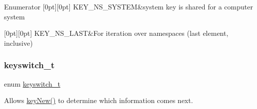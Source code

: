 \begin{DoxyEnumFields}{Enumerator}
[0pt][0pt]{}\mbox{\label{group__key_ggaec3b8d6f430ae49b91bafe8a86310a68a61adca2f9dff47e65dfcdb492ffa7a20}} 
K\+E\+Y\+\_\+\+N\+S\+\_\+\+S\+Y\+S\+T\+EM&system key is shared for a computer system \\
\hline

[0pt][0pt]{}\mbox{\label{group__key_ggaec3b8d6f430ae49b91bafe8a86310a68ad4d0f219a657517ddd50cd06c8190310}} 
K\+E\+Y\+\_\+\+N\+S\+\_\+\+L\+A\+ST&For iteration over namespaces (last element, inclusive) \\
\hline

\end{DoxyEnumFields}
\mbox{\label{group__key_ga91fb3178848bd682000958089abbaf40}} 
\subsubsection{\texorpdfstring{keyswitch\+\_\+t}{keyswitch\_t}}
{\footnotesize\ttfamily enum \hyperlink{group__key_ga91fb3178848bd682000958089abbaf40}{keyswitch\+\_\+t}}



Allows \hyperlink{group__key_gad23c65b44bf48d773759e1f9a4d43b89}{key\+New()} to determine which information comes next. 

